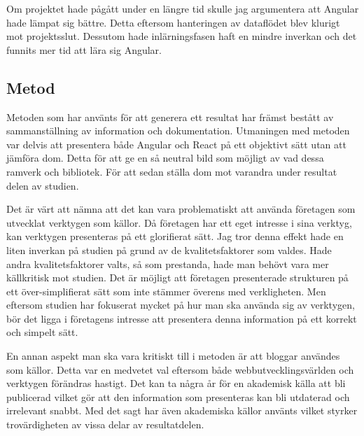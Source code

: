 Om projektet hade pågått under en längre tid skulle jag argumentera att Angular hade lämpat sig bättre. Detta eftersom hanteringen av dataflödet blev klurigt mot projektsslut. Dessutom hade inlärningsfasen haft en mindre inverkan och det funnits mer tid att lära sig Angular.

\subsection{Metod}
\label{subsec:axel-discussion-method}
Metoden som har använts för att generera ett resultat har främst bestått av sammanställning av information och dokumentation. Utmaningen med metoden var delvis att presentera både Angular och React på ett objektivt sätt utan att jämföra dom. Detta för att ge en så neutral bild som möjligt av vad dessa ramverk och bibliotek. För att sedan ställa dom mot varandra under resultat delen av studien. 

Det är värt att nämna att det kan vara problematiskt att använda företagen som utvecklat verktygen som källor. Då företagen har ett eget intresse i sina verktyg, kan verktygen presenteras på ett glorifierat sätt. Jag tror denna effekt hade en liten inverkan på studien på grund av de kvalitetsfaktorer som valdes. Hade andra kvalitetsfaktorer valts, så som prestanda, hade man behövt vara mer källkritisk mot studien. Det är möjligt att företagen presenterade strukturen på ett över-simplifierat sätt som inte stämmer överens med verkligheten. Men eftersom studien har fokuserat mycket på hur man ska använda sig av verktygen, bör det ligga i företagens intresse att presentera denna information på ett korrekt och simpelt sätt. 

En annan aspekt man ska vara kritiskt till i metoden är att bloggar användes som källor. Detta var en medvetet val eftersom både webbutvecklingsvärlden och verktygen förändras hastigt. Det kan ta några år för en akademisk källa att bli publicerad vilket gör att den information som presenteras kan bli utdaterad och irrelevant snabbt. Med det sagt har även akademiska källor använts vilket styrker trovärdigheten av vissa delar av resultatdelen.

\pagebreak